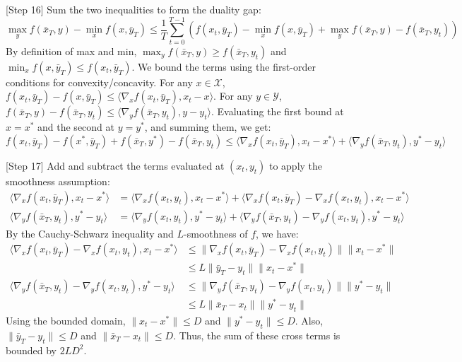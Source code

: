 \documentclass{article}
\begin{document}
[Step 16] Sum the two inequalities to form the duality gap:
$$ \max_{y} f(\bar{x}_T, y) - \min_{x} f(x, \bar{y}_T) \leq \frac{1}{T} \sum_{t=0}^{T-1} \left( f(x_t, \bar{y}_T) - \min_{x} f(x, \bar{y}_T) + \max_{y} f(\bar{x}_T, y) - f(\bar{x}_T, y_t) \right) $$
By definition of max and min, $\max_y f(\bar{x}_T, y) \geq f(\bar{x}_T, y_t)$ and $\min_x f(x, \bar{y}_T) \leq f(x_t, \bar{y}_T)$. We bound the terms using the first-order conditions for convexity/concavity. For any $x \in \mathcal{X}$, $f(x_t, \bar{y}_T) - f(x, \bar{y}_T) \leq \langle \nabla_x f(x_t, \bar{y}_T), x_t - x \rangle$. For any $y \in \mathcal{Y}$, $f(\bar{x}_T, y) - f(\bar{x}_T, y_t) \leq \langle \nabla_y f(\bar{x}_T, y_t), y - y_t \rangle$.
Evaluating the first bound at $x = x^*$ and the second at $y = y^*$, and summing them, we get:
$$ f(x_t, \bar{y}_T) - f(x^*, \bar{y}_T) + f(\bar{x}_T, y^*) - f(\bar{x}_T, y_t) \leq \langle \nabla_x f(x_t, \bar{y}_T), x_t - x^* \rangle + \langle \nabla_y f(\bar{x}_T, y_t), y^* - y_t \rangle $$

[Step 17] Add and subtract the terms evaluated at $(x_t, y_t)$ to apply the smoothness assumption:
\begin{align*}
\langle \nabla_x f(x_t, \bar{y}_T), x_t - x^* \rangle &= \langle \nabla_x f(x_t, y_t), x_t - x^* \rangle + \langle \nabla_x f(x_t, \bar{y}_T) - \nabla_x f(x_t, y_t), x_t - x^* \rangle \\
\langle \nabla_y f(\bar{x}_T, y_t), y^* - y_t \rangle &= \langle \nabla_y f(x_t, y_t), y^* - y_t \rangle + \langle \nabla_y f(\bar{x}_T, y_t) - \nabla_y f(x_t, y_t), y^* - y_t \rangle
\end{align*}
By the Cauchy-Schwarz inequality and $L$-smoothness of $f$, we have:
\begin{align*}
\langle \nabla_x f(x_t, \bar{y}_T) - \nabla_x f(x_t, y_t), x_t - x^* \rangle &\leq \|\nabla_x f(x_t, \bar{y}_T) - \nabla_x f(x_t, y_t)\| \|x_t - x^*\| \\
&\leq L \|\bar{y}_T - y_t\| \|x_t - x^*\| \\
\langle \nabla_y f(\bar{x}_T, y_t) - \nabla_y f(x_t, y_t), y^* - y_t \rangle &\leq \|\nabla_y f(\bar{x}_T, y_t) - \nabla_y f(x_t, y_t)\| \|y^* - y_t\| \\
&\leq L \|\bar{x}_T - x_t\| \|y^* - y_t\|
\end{align*}
Using the bounded domain, $\|x_t - x^*\| \leq D$ and $\|y^* - y_t\| \leq D$. Also, $\|\bar{y}_T - y_t\| \leq D$ and $\|\bar{x}_T - x_t\| \leq D$. Thus, the sum of these cross terms is bounded by $2 L D^2$.
\end{document}
